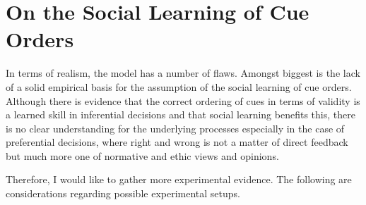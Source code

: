 
\section{On the Social Learning of Cue Orders}

In terms of realism, the model has a number of flaws. Amongst biggest is the lack of a solid empirical basis for the assumption of the social learning of cue orders.
Although there is evidence that the correct ordering of cues in terms of validity is a learned skill in inferential decisions and that social learning benefits this, there is no clear understanding for the underlying processes especially in the case of preferential decisions, where right and wrong is not a matter of direct feedback but much more one of normative and ethic views and opinions.
\par
Therefore, I would like to gather more experimental evidence. The following are considerations regarding possible experimental setups.
